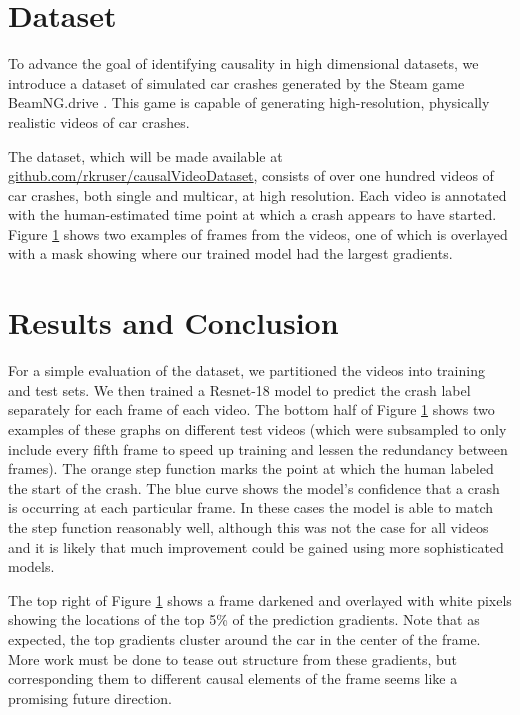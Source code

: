 \documentclass[letterpaper, twocolumn]{article} %
\begin{document}
\begin{figure}
\label{fig:carframes}
\end{figure}

\section{Dataset}

To advance the goal of identifying causality in high dimensional datasets, we introduce a dataset of simulated car crashes generated by the Steam game BeamNG.drive \cite{beamng}. This game is capable of generating high-resolution, physically realistic videos of car crashes.

The dataset, which will be made available at \url{github.com/rkruser/causalVideoDataset}, consists of over one hundred videos of car crashes, both single and multicar, at high resolution. Each video is annotated with the human-estimated time point at which a crash appears to have started. Figure \ref{fig:carframes} shows two examples of frames from the videos, one of which is overlayed with a mask showing where our trained model had the largest gradients.

\vspace{-0.3cm}




\section{Results and Conclusion}

For a simple evaluation of the dataset, we partitioned the videos into training and test sets. We then trained a Resnet-18 model to predict the crash label separately for each frame of each video. The bottom half of Figure \ref{fig:carframes} shows two examples of these graphs on different test videos (which were subsampled to only include every fifth frame to speed up training and lessen the redundancy between frames). The orange step function marks the point at which the human labeled the start of the crash. The blue curve shows the model's confidence that a crash is occurring at each particular frame. In these cases the model is able to match the step function reasonably well, although this was not the case for all videos and it is likely that much improvement could be gained using more sophisticated models.

The top right of Figure \ref{fig:carframes} shows a frame darkened and overlayed with white pixels showing the locations of the top 5\% of the prediction gradients. Note that as expected, the top gradients cluster around the car in the center of the frame. More work must be done to tease out structure from these gradients, but corresponding them to different causal elements of the frame seems like a promising future direction.










\end{document}

